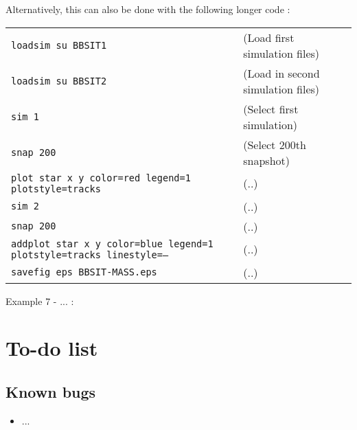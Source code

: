 \documentclass[a4paper]{article}
\newcommand{\var}[1]{\texttt{#1}}
\begin{document}
\noindent Alternatively, this can also be done with the following longer code : \\

\begin{tabular}{p{7cm}p{6cm}}
\var{loadsim su BBSIT1} &              (Load first simulation files) \\
\var{loadsim su BBSIT2} &              (Load in second simulation files) \\
\var{sim 1} &                          (Select first simulation) \\
\var{snap 200} &                       (Select 200th snapshot) \\
\var{plot star x y color=red legend=1 plotstyle=tracks} & (..) \\
\var{sim 2} &                          (..) \\
\var{snap 200} &                       (..) \\
\var{addplot star x y color=blue legend=1 plotstyle=tracks linestyle=--} & (..) \\
\var{savefig eps BBSIT-MASS.eps} &     (..) \\
\end{tabular}
\newline


\noindent Example 7 - ... :





\section{To-do list}

\subsection{Known bugs}
\begin{itemize}
\item ...
\end{itemize}
\end{document}
